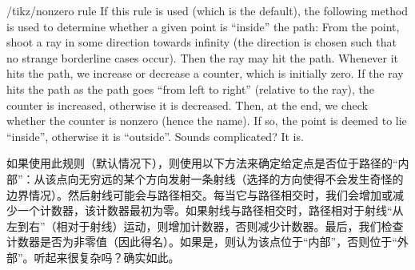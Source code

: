 \begin{key}{/tikz/nonzero rule}
    If this rule is used (which is the default), the following method is used
    to determine whether a given point is ``inside'' the path: From the point,
    shoot a ray in some direction towards infinity (the direction is chosen
    such that no strange borderline cases occur). Then the ray may hit the
    path. Whenever it hits the path, we increase or decrease a counter, which
    is initially zero. If the ray hits the path as the path goes ``from left to
    right'' (relative to the ray), the counter is increased, otherwise it is
    decreased. Then, at the end, we check whether the counter is nonzero (hence
    the name). If so, the point is deemed to lie ``inside'', otherwise it is
    ``outside''. Sounds complicated? It is.
    
    如果使用此规则（默认情况下），则使用以下方法来确定给定点是否位于路径的“内部”：从该点向无穷远的某个方向发射一条射线（选择的方向使得不会发生奇怪的边界情况）。然后射线可能会与路径相交。每当它与路径相交时，我们会增加或减少一个计数器，该计数器最初为零。如果射线与路径相交时，路径相对于射线“从左到右”（相对于射线）运动，则增加计数器，否则减少计数器。最后，我们检查计数器是否为非零值（因此得名）。如果是，则认为该点位于“内部”，否则位于“外部”。听起来很复杂吗？确实如此。
\begin{codeexample}[]
\end{codeexample}
\end{key}

